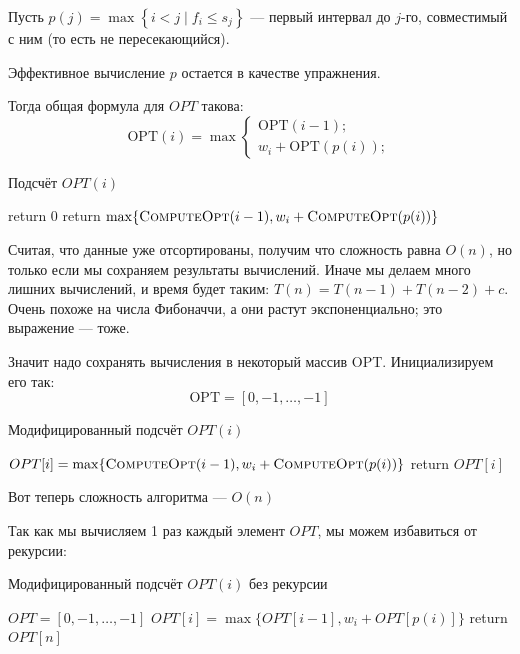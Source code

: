 \documentclass[a4paper,12pt]{article}
\begin{document}
Пусть $p(j) = \max\left\{ i<j \mid f_{i}\leqslant s_j\right\}$ --- первый интервал до $j$-го, совместимый с ним (то есть не пересекающийся).

Эффективное вычисление $p$ остается в качестве упражнения.

Тогда общая формула для $OPT$ такова:
\[
    \mathrm{OPT}(i) = \max\begin{cases}
        \mathrm{OPT}(i-1);\\
        w_i+ \mathrm{OPT}(p(i));
    \end{cases}
\]


\begin{algorithm}
	\caption{Подсчёт $OPT(i)$}
	\begin{algorithmic}[1]
				\State return 0
			\EndIf
			\State return \(\max \{\textsc{ComputeOpt}(i - 1), w_i + \textsc{ComputeOpt}(p(i))\}\)
		\EndFunction
	\end{algorithmic}
\end{algorithm}

Считая, что данные уже отсортированы, получим что сложность равна $O(n)$, но только если мы сохраняем результаты вычислений.
Иначе мы делаем много лишних вычислений, и время будет таким: $T(n) = T(n-1)+T(n-2)+c$.
Очень похоже на числа Фибоначчи, а они растут экспоненциально; это выражение --- тоже.


Значит надо сохранять вычисления в некоторый массив OPT.
Инициализируем его так: 
\[
\mathrm{OPT} = [0, -1, \ldots, -1]
\]

\begin{algorithm}
	\caption{Модифицированный подсчёт $OPT(i)$}
	\begin{algorithmic}[1]
				\State \(OPT[i] = \max \{\textsc{ComputeOpt}(i - 1), w_i + \textsc{ComputeOpt}(p(i))\}\)
			\EndIf
			\State return \(OPT[i]\)
		\EndFunction
	\end{algorithmic}
\end{algorithm}

Вот теперь сложность алгоритма --- $O(n)$

Так как мы вычисляем 1 раз каждый элемент $OPT$, мы можем избавиться от рекурсии:\\

\begin{algorithm}
	\caption{Модифицированный подсчёт $OPT(i)$ без рекурсии}
	\begin{algorithmic}[1]
			\State $OPT = [0, -1, \ldots, -1]$
				\State \(OPT[i] = \max \{OPT[i - 1], w_i + OPT[p(i)]\}\)
			\EndFor
			\State return \(OPT[n]\)
		\EndFunction
	\end{algorithmic}
\end{algorithm}
\end{document}
